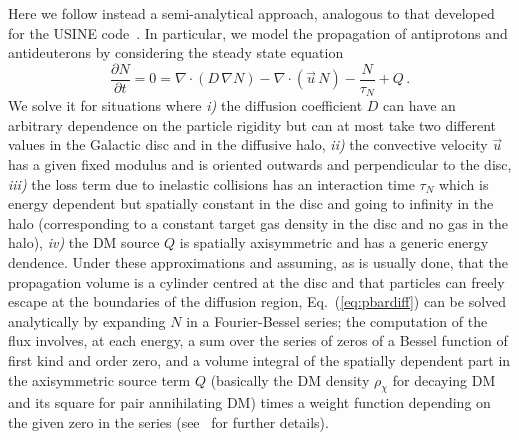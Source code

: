 Here we follow instead a semi-analytical approach, analogous to that developed for the USINE 
code~\cite{Maurin:2001sj}. In particular, we model
the propagation of antiprotons and antideuterons by considering the steady state equation~\cite{Bergstrom:1999jc}
\begin{equation}
 \frac{\partial{N}}{\partial{t}} = 0 = \nabla \cdot
 \left(D\,\nabla N\right)
 - \nabla \cdot \left( \vec{u}\,N \right)
 - \frac{N}{\tau_N} + Q\,.
\label{eq:pbardiff}
\end{equation}
We solve it for situations where {\it i)} the diffusion coefficient $D$ can have an arbitrary dependence on the particle 
rigidity but can at most take two different values in the Galactic disc and in the diffusive halo, {\it ii)} the 
convective velocity $\vec{u}$ has a given fixed modulus and is oriented outwards and perpendicular to the disc,
{\it iii)} the loss term due to inelastic collisions has an interaction time $\tau_N$ which is energy dependent 
but spatially constant in the disc and going to infinity in the halo (corresponding to a constant target gas 
density in the disc and no gas in the halo), {\it iv)} the DM
source $Q$ is spatially axisymmetric and has a generic energy dendence. Under these
approximations and assuming, as is usually done, that the propagation volume is a cylinder centred at the disc 
and that particles can freely
escape at the boundaries of the diffusion region, Eq.~(\ref{eq:pbardiff}) can be solved analytically by expanding $N$
in a Fourier-Bessel series; the computation of the flux involves, at each energy, a sum over the series of 
zeros of a Bessel function of first kind and order zero, and a volume integral of the spatially dependent part in the axisymmetric
source term $Q$
 (basically the DM density $\rho_\chi$ for decaying DM and its square for pair annihilating DM) 
times a
weight function depending on the given zero in the series (see~\cite{Bergstrom:1999jc} for further details).

